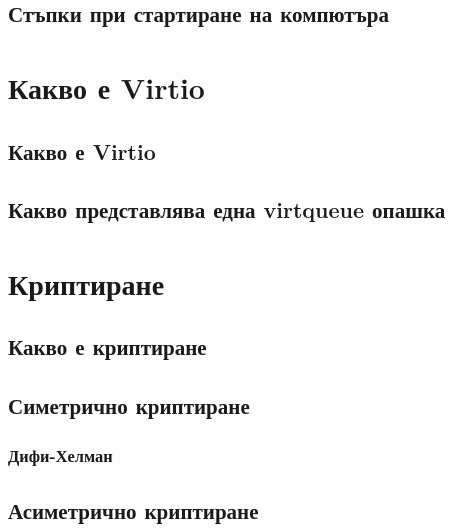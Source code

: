   \subsection{Стъпки при стартиране на компютъра}
\section{Какво е Virtio}
  \subsection{Какво е Virtio}
  \subsection{Какво представлява една virtqueue опашка}
\section{Криптиране}
  \subsection{Какво е криптиране}
  \subsection{Симетрично криптиране}
    \subsubsection{Дифи-Хелман}
  \subsection{Асиметрично криптиране}
